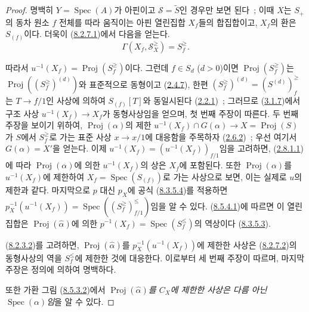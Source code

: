 \begin{proof}
명백히 $Y=\operatorname{Spec}(A)$가 아핀이고
$\mathcal{S}=\widetilde{S}$인 경우만 보면 된다~; 이때 $X$는 $S_+$의
동차 원소 $f$ 전체를 따라 움직이는 아핀 열린집합 $X_f$들의 합집합이고,
$X_f$의 환은 $S_{(f)}$이다. 더욱이
(\hyperref[II.8.2.7.1-ko]{8.2.7.1})에서 다음을 얻는다.
\begin{equation}
\label{II.8.6.2.1-ko}
  \Gamma(X_f,\mathcal{S}_X^{\geq})=S_f^{\geq}.
\tag{8.6.2.1}
\end{equation}

따라서 $u^{-1}(X_f)=\operatorname{Proj}(S_f^{\geq})$이다. 그런데
$f\in S_d$ ($d>0$)이면 $\operatorname{Proj}(S_f^{\geq})$는
$\operatorname{Proj}((S_f^{\geq})^{(d)})$와 표준적으로 동형이고
(\hyperref[II.2.4.7-ko]{2.4.7}), 한편
$(S_f^{\geq})^{(d)}=(S^{(d)})_f^{\geq}$는 $T\to f/1$인 사상에 의하여
$S_{(f)}[T]$와 동일시된다
(\hyperref[II.2.2.1-ko]{2.2.1})~; 그러므로
(\hyperref[II.3.1.7-ko]{3.1.7})에서 구조 사상
$u^{-1}(X_f)\to X_f$가 동형사상임을 얻으며, 첫 번째 주장이 따른다.
두 번째 주장을 보이기 위하여, $\operatorname{Proj}(\alpha)$의 제한
$u^{-1}(X_f)\cap G(\alpha)\to X=\operatorname{Proj}(S)$가 $S$에서
$S_f^{\geq}$로 가는 표준 사상 $x\to x/1$에 대응함을 주목하자
(\hyperref[II.2.6.2-ko]{2.6.2})~; 우선 여기서 $G(\alpha)=X'$을 얻는다.
이제 $u^{-1}(X_f)=(u^{-1}(X_f))_{f/1}$임을 고려하면,
(\hyperref[II.2.8.1.1-ko]{2.8.1.1})에 따라
$\operatorname{Proj}(\alpha)$에 의한 $u^{-1}(X_f)$의 상은 $X_f$에
포함된다. 또한 $\operatorname{Proj}(\alpha)$를 $u^{-1}(X_f)$에
제한하여 $X_f=\operatorname{Spec}(S_{(f)})$로 가는 사상으로 보면,
이는 실제로 $u$의 제한과 같다.
마지막으로 $p$ 대신 $p_X$에 공식
(\hyperref[II.8.3.5.4-ko]{8.3.5.4})를 적용하면
$p_X^{-1}(u^{-1}(X_f))=
\operatorname{Spec}((S_f^{\geq})_{f/1}^{\leq})$임을 알 수 있다.
(\hyperref[II.8.5.4.1-ko]{8.5.4.1})에 따르면 이 열린집합은
$\operatorname{Proj}(\widehat{\alpha})$에 의한
$p^{-1}(X_f)=\operatorname{Spec}(S_f^{\leq})$의 역상이다
(\hyperref[II.8.3.5.3-ko]{8.3.5.3}).

(\hyperref[II.8.2.3.2-ko]{8.2.3.2})를 고려하면,
$\operatorname{Proj}(\widehat{\alpha})$를
$p_X^{-1}(u^{-1}(X_f))$에 제한한 사상은
(\hyperref[II.8.2.7.2-ko]{8.2.7.2})의 동형사상의 역을
$S_f^{\leq}$에 제한한 것에 대응한다. 이로부터 세 번째 주장이
따르며, 마지막 주장은 정의에 의하여 명백하다.

또한 가환 그림 (\hyperref[II.8.5.3.2-ko]{8.5.3.2})에서
\emph{$\operatorname{Proj}(\widehat{\alpha})$를 $C_X$에 제한한 사상은
다름 아닌 $\operatorname{Spec}(\alpha)$임}을 알 수 있다.
\end{proof}

